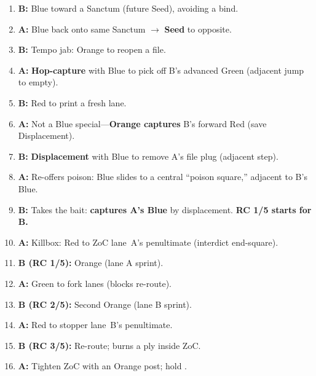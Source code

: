 \begin{multicols}{2}
\begin{enumerate}[leftmargin=*,itemsep=0.35em,label=\textbf{M\arabic*:}]
\item \textbf{B:} Blue  toward a Sanctum (future Seed), avoiding a bind.

\item \textbf{A:} Blue  back onto same Sanctum $\to$ \textbf{Seed} to opposite. \RoC\; 

\item \textbf{B:} Tempo jab: Orange  to reopen a file.

\item \textbf{A:} \textbf{Hop-capture} with Blue to pick off B’s advanced Green (adjacent jump to empty). \; 

\item \textbf{B:} Red  to print a fresh lane.

\item \textbf{A:} Not a Blue special—\textbf{Orange captures} B’s forward Red (save Displacement).

\item \textbf{B:} \textbf{Displacement} with Blue to remove A’s file plug (adjacent step). 

\item \textbf{A:} Re-offers poison: Blue slides to a central “poison square,” adjacent to B’s Blue. 

\item \textbf{B:} Takes the bait: \textbf{captures A’s Blue} by displacement. \textbf{RC 1/5 starts for B.}

\item \textbf{A:} Killbox: Red  to ZoC lane~A’s penultimate (interdict end-square).

\item \textbf{B (RC 1/5):} Orange  (lane A sprint).

\item \textbf{A:} Green  to fork lanes (blocks re-route).

\item \textbf{B (RC 2/5):} Second Orange  (lane B sprint).

\item \textbf{A:} Red  to stopper lane~B’s penultimate.

\item \textbf{B (RC 3/5):} Re-route; burns a ply inside ZoC.

\item \textbf{A:} Tighten ZoC with an Orange post; hold . 


\end{enumerate}
\end{multicols}
